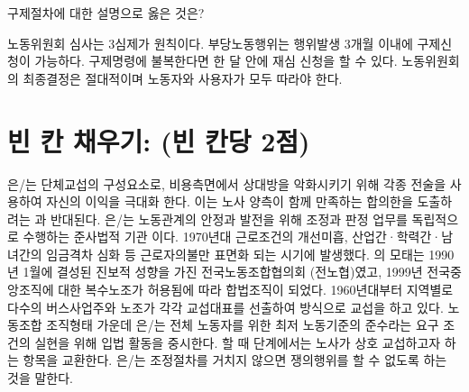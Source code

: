 \documentclass[11pt,answers]{exam} %
\begin{document}
\begin{questions}
 구제절차에 대한 설명으로 옳은 것은?
    \begin{choices}
    \choice\relax 노동위원회 심사는 3심제가 원칙이다.
    \CorrectChoice\relax 부당노동행위는 행위발생 3개월 이내에 구제신청이 가능하다.
    \choice\relax 구제명령에 불복한다면 한 달 안에 재심 신청을 할 수 있다.
    \choice\relax 노동위원회의 최종결정은 절대적이며 노동자와 사용자가 모두 따라야 한다.
    \end{choices}
\pagebreak

\section*{빈 칸 채우기: (빈 칸당 2점)}

\question\fillin[분배적 교섭]{}은/는 단체교섭의 구성요소로, 비용측면에서 상대방을 악화시키기 위해 각종 전술을 사용하여 자신의 이익을 극대화 한다. 이는 노사 양측이 함께 만족하는 합의한을 도출하려는 \fillin[통합적 교섭]{}과 반대된다.
\question\fillin[노동위원회]{}은/는 노동관계의 안정과 발전을 위해 조정과 판정 업무를 독립적으로 수행하는 준사법적 기관 이다.
\question\fillin[전태일 사건]{} 1970년대 근로조건의 개선미흡, 산업간·학력간·남녀간의 임금격차 심화 등 근로자의불만 표면화 되는 시기에 발생했다.
\question\fillin[민주노총]{}의 모태는 1990년 1월에 결성된 진보적 성향을 가진 전국노동조합협의회 (전노협)였고, 1999년 전국중앙조직에 대한 복수노조가 허용됨에 따라 합법조직이 되었다.
 1960년대부터 지역별로 다수의 버스사업주와 노조가 각각 교섭대표를 선출하여 \fillin[집단교섭]{} 방식으로 교섭을 하고 있다.
 노동조합 조직형태 가운데 \fillin[일반조합]{}은/는 전체 노동자를 위한 최저 노동기준의 준수라는 요구 조건의 실현을 위해 입법 활동을 중시한다.
 할 때 \fillin[예비회담]{} 단계에서는 노사가 상호 교섭하고자 하는 항목을 교환한다.
\question\fillin[조정전치주의]{}은/는 조정절차를 거치지 않으면 쟁의행위를 할 수 없도록 하는 것을 말한다.

\end{questions}
\end{document}
